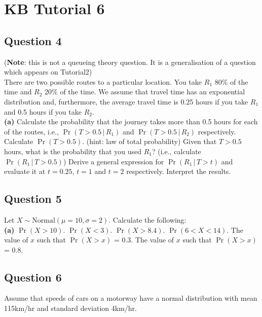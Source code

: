 
\newpage
\section{KB Tutorial 6}






\subsection*{Question 4}
{\footnotesize({\bf Note}: this is not a queueing theory question. It is a generalisation of a question which appears on Tutorial2)}\\[0.1cm]
There are two possible routes to a particular location. You take $R_1$ 80\% of the time and $R_2$ 20\% of the time. We assume that travel time has an exponential distribution and, furthermore, the average travel time is 0.25 hours if you take $R_1$ and 0.5 hours if you take $R_2$.\\[-0.2cm]

{\bf(a)} Calculate the probability that the journey takes more than 0.5 hours for each of the routes, i.e., $\Pr(T > 0.5\,|\,R_1)$ and $\Pr(T > 0.5\,|\,R_2)$ respectively.  Calculate $\Pr(T > 0.5)$. (hint: law of total probability)  Given that $T>0.5$ hours, what is the probability that you used $R_1$? (i.e., calculate $\Pr(R_1\,|\,T>0.5)$)  Derive a general expression for $\Pr(R_1\,|\,T>t)$ and evaluate it at $t=0.25$, $t = 1$ and $t = 2$ respectively. Interpret the results.




\subsection*{Question 5}
Let $X \sim \text{Normal}(\mu=10,\sigma=2)$. Calculate the following:\\[-0.2cm]

{\bf(a)} $\Pr(X>10)$.  $\Pr(X<3)$.  $\Pr(X>8.4)$.  $\Pr(6<X<14)$.  The value of $x$ such that $\Pr(X>x)$ = 0.3.  The value of $x$ such that $\Pr(X>x)$ = 0.8.



\subsection*{Question 6}
Assume that speeds of cars on a motorway have a normal distribution with mean 115km/hr and standard deviation 4km/hr.\\[-0.2cm]

